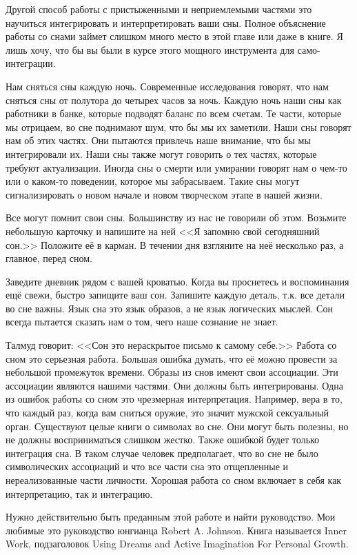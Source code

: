 \documentclass[10pt, fleqn]{article}
\begin{document}

Другой способ работы с пристыженными и неприемлемыми частями это научиться интегрировать и интерпретировать ваши сны. Полное объяснение работы со снами займет слишком много место в этой главе или даже в книге. Я лишь хочу, что бы вы были в курсе этого мощного инструмента для само-интеграции.

Нам сняться сны каждую ночь. Современные исследования говорят, что нам сняться сны от полутора до четырех часов за ночь. Каждую ночь наши сны как работники в банке, которые подводят баланс по всем счетам. Те части, которые мы отрицаем, во сне поднимают шум, что бы мы их заметили. Наши сны говорят нам об этих частях. Они пытаются привлечь наше внимание, что бы мы интегрировали их. Наши сны также могут говорить о тех частях, которые требуют актуализации. Иногда сны о смерти или умирании говорят нам о чем-то или о каком-то поведении, которое мы забрасываем. Такие сны могут сигнализировать о новом начале и новом творческом этапе в нашей жизни.

Все могут помнит свои сны. Большинству из нас не говорили об этом. Возьмите небольшую карточку и напишите на ней <<Я запомню свой сегодняшний сон.>> Положите её в карман. В течении дня взгляните на неё несколько раз, а главное, перед сном.

Заведите дневник рядом с вашей кроватью. Когда вы проснетесь и воспоминания ещё свежи, быстро запищите ваш сон. Запишите каждую деталь, т.к. все детали во сне важны. Язык сна это язык образов, а не язык логических мыслей. Сон всегда пытается сказать нам о том, чего наше сознание не знает.

Талмуд говорит: <<Сон это нераскрытое письмо к самому себе.>>
Работа со сном это серьезная работа. Большая ошибка думать, что её можно провести за небольшой промежуток времени. Образы из снов имеют свои ассоциации. Эти ассоциации являются нашими частями. Они должны быть интегрированы. Одна из ошибок работы со сном это чрезмерная интерпретация. Например, вера в то, что каждый раз, когда вам сниться оружие, это значит мужской сексуальный орган. Существуют целые книги о символах во сне. Они могут быть полезны, но не должны восприниматься слишком жестко. Также ошибкой будет только интеграция сна. В таком случае человек предполагает, что во сне не было символических ассоциаций и что все части сна это отщепленные и нереализованные части личности. Хорошая работа со сном включает в себя как интерпретацию, так и интеграцию.

Нужно действительно быть преданным этой работе и найти руководство. Мои любимые это руководство юнгианца Robert A. Johnson. Книга называется Inner Work, подзаголовок Using Dreams and Active Imagination For Personal Growth.
\end{document}
